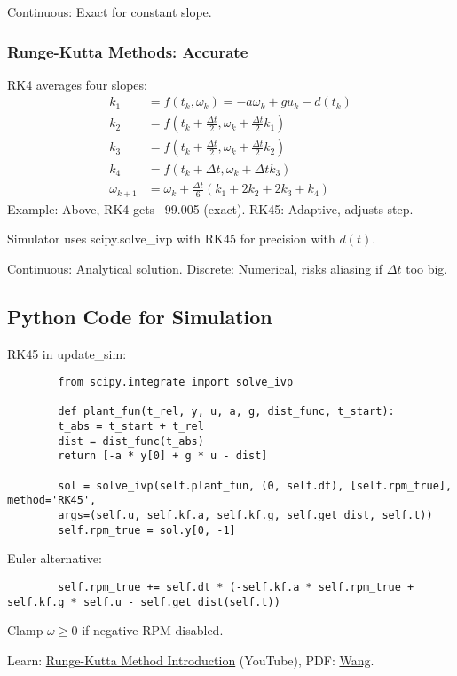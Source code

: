 \documentclass[conference]{IEEEtran}
\begin{document}
	Continuous: Exact for constant slope.
	
	\subsubsection{Runge-Kutta Methods: Accurate}
	RK4 averages four slopes:
	\begin{align}
		k_1 &= f(t_k, \omega_k) = -a \omega_k + g u_k - d(t_k) \\
		k_2 &= f(t_k + \frac{\Delta t}{2}, \omega_k + \frac{\Delta t}{2} k_1) \\
		k_3 &= f(t_k + \frac{\Delta t}{2}, \omega_k + \frac{\Delta t}{2} k_2) \\
		k_4 &= f(t_k + \Delta t, \omega_k + \Delta t k_3) \\
		\omega_{k+1} &= \omega_k + \frac{\Delta t}{6} (k_1 + 2k_2 + 2k_3 + k_4)
	\end{align}
	Example: Above, RK4 gets ~99.005 (exact). RK45: Adaptive, adjusts step.
	
	Simulator uses scipy.solve\_ivp with RK45 for precision with $d(t)$.
	
	Continuous: Analytical solution. Discrete: Numerical, risks aliasing if $\Delta t$ too big.
	
	\subsection{Python Code for Simulation}
	RK45 in update\_sim:
	
	\begin{lstlisting}
		from scipy.integrate import solve_ivp
		
		def plant_fun(t_rel, y, u, a, g, dist_func, t_start):
		t_abs = t_start + t_rel
		dist = dist_func(t_abs)
		return [-a * y[0] + g * u - dist]
		
		sol = solve_ivp(self.plant_fun, (0, self.dt), [self.rpm_true], method='RK45',
		args=(self.u, self.kf.a, self.kf.g, self.get_dist, self.t))
		self.rpm_true = sol.y[0, -1]
	\end{lstlisting}
	
	Euler alternative:
	
	\begin{lstlisting}
		self.rpm_true += self.dt * (-self.kf.a * self.rpm_true + self.kf.g * self.u - self.get_dist(self.t))
	\end{lstlisting}
	
	Clamp $\omega \geq 0$ if negative RPM disabled.
	
	Learn: \href{https://www.youtube.com/watch?v=kUcc8vAgoQ0}{Runge-Kutta Method Introduction} (YouTube), PDF: \href{https://math.okstate.edu/people/yqwang/teaching/math4513_fall11/Notes/rungekutta.pdf}{Wang}.
	
\end{document}
